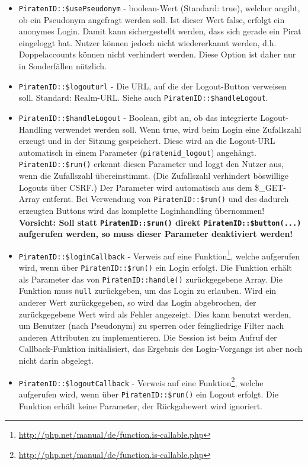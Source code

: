 \begin{itemize}
	\item \texttt{PiratenID::\$usePseudonym} - boolean-Wert (Standard: true), welcher angibt, ob ein Pseudonym angefragt werden soll.
											Ist dieser Wert false, erfolgt ein anonymes Login.
											Damit kann sichergestellt werden, dass sich gerade ein Pirat eingeloggt hat.
											Nutzer können jedoch nicht wiedererkannt werden, d.h. Doppelaccounts können nicht verhindert werden.
											Diese Option ist daher nur in Sonderfällen nützlich.
	
	\item \texttt{PiratenID::\$logouturl} - Die URL, auf die der Logout-Button verweisen soll. Standard: Realm-URL.
											Siehe auch \texttt{PiratenID::\$handleLogout}.

	\item \texttt{PiratenID::\$handleLogout} - Boolean, gibt an, ob das integrierte Logout-Handling verwendet werden soll.
											Wenn true, wird beim Login eine Zufallszahl erzeugt und in der Sitzung gespeichert.
											Diese wird an die Logout-URL automatisch in einem Parameter (\texttt{piratenid\_logout}) angehängt.
											\texttt{PiratenID::\$run()} erkennt diesen Parameter und loggt den Nutzer aus,
											wenn die Zufallszahl übereinstimmt. (Die Zufallszahl verhindert böswillige Logouts über CSRF.)
											Der Parameter wird automatisch aus dem \$\_GET-Array entfernt.
											Bei Verwendung von \texttt{PiratenID::\$run()} und des dadurch erzeugten Buttons
											wird das komplette Loginhandling übernommen!
											\\\textbf{Vorsicht:
												Soll statt \texttt{PiratenID::\$run()} direkt \texttt{PiratenID::\$button(...)} aufgerufen werden,
												so muss dieser Parameter deaktiviert werden! }
												
	\item \texttt{PiratenID::\$loginCallback} - Verweis auf eine Funktion\footnote{\url{http://php.net/manual/de/function.is-callable.php}},
											welche aufgerufen wird, wenn über \texttt{PiratenID::\$run()} ein Login erfolgt.
											Die Funktion erhält als Parameter das von \texttt{PiratenID::handle()} zurückgegebene Array.
											Die Funktion muss \texttt{null} zurückgeben, um das Login zu erlauben.
											Wird ein anderer Wert zurückgegeben, so wird das Login abgebrochen,
											der zurückgegebene Wert wird als Fehler angezeigt.
											Dies kann benutzt werden, um Benutzer (nach Pseudonym) zu sperren oder
											feingliedrige Filter nach anderen Attributen zu implementieren.
											Die Session ist beim Aufruf der Callback-Funktion initialisiert,
											das Ergebnis des Login-Vorgangs ist aber noch nicht darin abgelegt.
	
	\item \texttt{PiratenID::\$logoutCallback} - Verweis auf eine Funktion\footnote{\url{http://php.net/manual/de/function.is-callable.php}},
											welche aufgerufen wird, wenn über \texttt{PiratenID::\$run()} ein Logout erfolgt.
											Die Funktion erhält keine Parameter, der Rückgabewert wird ignoriert.

\end{itemize}

